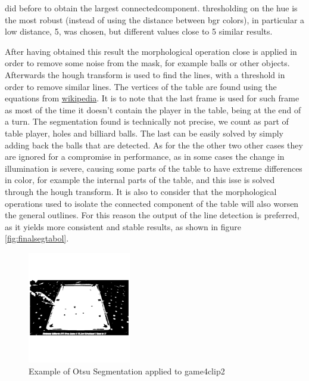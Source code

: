 did before to obtain the largest connectedcomponent. thresholding on the hue
is the most robust (instead of using the distance between bgr colors), in particular a low distance, 5, was chosen, but different values close to 5 similar results.\par
After having obtained this result the morphological operation close is applied in order to remove some noise from the mask,
for example balls or other objects. Afterwards the hough transform is used to find the lines, 
with a threshold in order to remove similar lines.
The vertices of the table are found using the equations from \href{https://en.wikipedia.org/wiki/Line\%E2\%80\%93line\_intersection}{wikipedia}.
It is to note that the last frame is used for such frame as most of the time it doesn't contain the player in the table, being at the end of
a turn.
The segmentation found is technically not precise, we count as part of table player, holes and billiard balls. The last can be easily solved by simply adding back the balls that are detected. 
As for the the other two other cases they are ignored for a compromise in performance, as in some
cases the change in illumination is severe, causing some parts of the table to have extreme 
differences in color, for example the internal parts of the table, and this isse is solved through 
the hough transform. It is also to consider that the morphological operations used to isolate the connected component of the table will also worsen
the general outlines. For this reason the output of the line detection is preferred, as it yields
more consistent and stable results, as shown in figure \ref{fig:finalsegtabol}.

\begin{figure}
    \centering
    \includegraphics[width=0.4\textwidth]{./imgs/otsu_table.png}
    \caption{Example of Otsu Segmentation applied to game4clip2}
    \label{fig:otsutable}
\end{figure}

